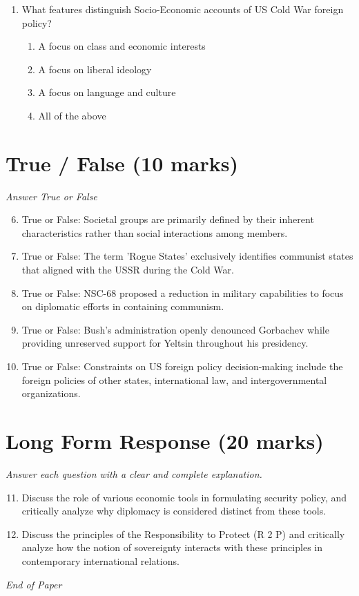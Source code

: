 \documentclass[12pt]{article}
\begin{document}
\begin{enumerate}[label=\arabic*.]
\begin{enumerate}[label=(\alph*)]
    \item Increase in US finances
    \item Increase in US military capability
    \item Increase in US international influence
\end{enumerate}
\item What features distinguish Socio-Economic accounts of US Cold War foreign policy?
\begin{enumerate}[label=(\alph*)]
    \item A focus on class and economic interests
    \item A focus on liberal ideology
    \item A focus on language and culture
    \item All of the above
\end{enumerate}
\end{enumerate}

\section*{True / False (10 marks)}
\textit{Answer True or False}
\begin{enumerate}[label=\arabic*.]
\setcounter{enumi}{5}
\item True or False: Societal groups are primarily defined by their inherent characteristics rather than social interactions among members.
\item True or False: The term 'Rogue States' exclusively identifies communist states that aligned with the USSR during the Cold War.
\item True or False: NSC-68 proposed a reduction in military capabilities to focus on diplomatic efforts in containing communism.
\item True or False: Bush's administration openly denounced Gorbachev while providing unreserved support for Yeltsin throughout his presidency.
\item True or False: Constraints on US foreign policy decision-making include the foreign policies of other states, international law, and intergovernmental organizations.
\end{enumerate}

\section*{Long Form Response (20 marks)}
\textit{Answer each question with a clear and complete explanation.}
\begin{enumerate}[label=\arabic*.]
\setcounter{enumi}{10}
\item Discuss the role of various economic tools in formulating security policy, and critically analyze why diplomacy is considered distinct from these tools.
\item Discuss the principles of the Responsibility to Protect (R 2 P) and critically analyze how the notion of sovereignty interacts with these principles in contemporary international relations.
\end{enumerate}

\vfill
\noindent\textit{End of Paper}
\end{document}
